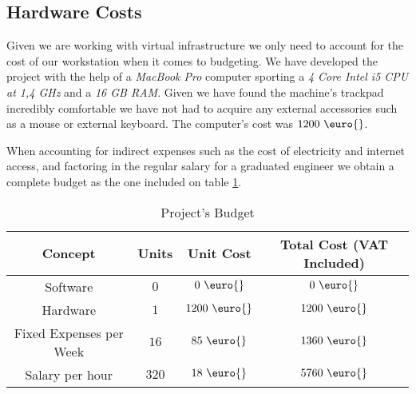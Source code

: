         \subsection{Hardware Costs}
            Given we are working with virtual infrastructure we only need to account for the cost of our workstation when it comes to budgeting. We have developed the project with the help of a \textit{MacBook Pro} computer sporting a \textit{4 Core Intel i5 CPU at 1,4 GHz} and a \textit{16 GB RAM}. Given we have found the machine's trackpad incredibly comfortable we have not had to acquire any external accessories such as a mouse or external keyboard. The computer's cost was $1200\ \text{\euro{}}$.

        When accounting for indirect expenses such as the cost of electricity and internet access, and factoring in the regular salary for a graduated engineer we obtain a complete budget as the one included on table \ref{tab:budget}.

        \begin{table}
            \centering
            \begin{tabular}{|c|c|c|c|}
                \hline
                \textbf{Concept} & \textbf{Units} & \textbf{Unit Cost} & \textbf{Total Cost (VAT Included)}\\
                \hline
                Software & $0$ & $0\ \text{\euro{}}$ & $0\ \text{\euro{}}$\\
                \hline
                Hardware & $1$ & $1200\ \text{\euro{}}$ & $1200\ \text{\euro{}}$\\
                \hline
                Fixed Expenses per Week & $16$ & $85\ \text{\euro{}}$ & $1360\ \text{\euro{}}$\\
                \hline
                Salary per hour & $320$ & $18\ \text{\euro{}}$ & $5760\ \text{\euro{}}$\\
                \hline
            \end{tabular}
            \caption{Project's Budget}
            \label{tab:budget}
        \end{table}
